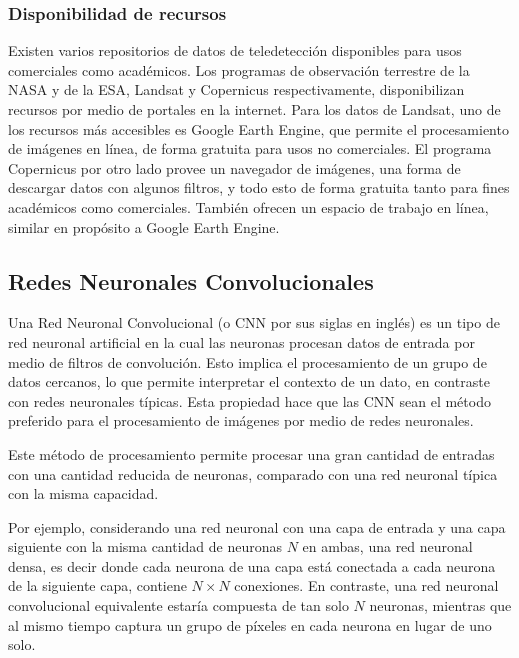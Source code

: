 \subsubsection{Disponibilidad de recursos}

Existen varios repositorios de datos de teledetección disponibles para usos comerciales como académicos. Los programas de observación terrestre de la NASA y de la ESA, Landsat y Copernicus respectivamente, disponibilizan recursos por medio de portales en la internet. Para los datos de Landsat, uno de los recursos más accesibles es Google Earth Engine, que permite el procesamiento de imágenes en línea, de forma gratuita para usos no comerciales. \autocite{landsat-data-access} El programa Copernicus por otro lado provee un navegador de imágenes, una forma de descargar datos con algunos filtros, y todo esto de forma gratuita tanto para fines académicos como comerciales. \autocite{copernicus-licences} También ofrecen un espacio de trabajo en línea, similar en propósito a Google Earth Engine. \autocite{copernicus-ds-about}


\subsection{Redes Neuronales Convolucionales}

Una Red Neuronal Convolucional (o CNN por sus siglas en inglés) es un tipo de red neuronal artificial en la cual las neuronas procesan datos de entrada por medio de filtros de convolución. Esto implica el procesamiento de un grupo de datos cercanos, lo que permite interpretar el contexto de un dato, en contraste con redes neuronales típicas. Esta propiedad hace que las CNN sean el método preferido para el procesamiento de imágenes por medio de redes neuronales. \autocite{hands-on-machine-learning} \autocite{ciresan-cnn}

Este método de procesamiento permite procesar una gran cantidad de entradas con una cantidad reducida de neuronas, comparado con una red neuronal típica con la misma capacidad.

Por ejemplo, considerando una red neuronal con una capa de entrada y una capa siguiente con la misma cantidad de neuronas $N$ en ambas, una red neuronal densa, es decir donde cada neurona de una capa está conectada a cada neurona de la siguiente capa, contiene $N \times N$ conexiones. En contraste, una red neuronal convolucional equivalente estaría compuesta de tan solo $N$ neuronas, mientras que al mismo tiempo captura un grupo de píxeles en cada neurona en lugar de uno solo.

